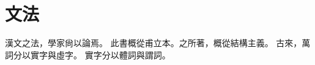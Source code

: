 \chapter*{文法}
漢文之法，學家尙以論焉。
此書概從甫立本。\cites{Pulleyblank:2005}之所著，概從結構主義\parencites[]{Pulleyblank:2005}。
古來，萬詞分以實字與虛字\parencites[43-44]{Pulleyblank:2005}。
實字分以體詞與謂詞\parencites{Pulleyblank:2005}。
